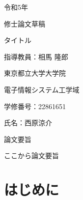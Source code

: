 \documentclass{ltjarticle}
\begin{document}
\begin{titlepage}
    \begin{center}
        {\Large 令和5年}
        \vspace{10truept}

        {\Large 修士論文草稿}
        \vspace*{180truept}

        {\Huge タイトル} 
        \vspace{160truept}

        {\Large 指導教員：相馬 隆郎}
        \vspace{30truept}

        {\Large 東京都立大学大学院}
        \vspace{10truept}

        {\Large 電子情報システム工学域}
        \vspace{30truept}

        {\Large 学修番号：22861651}
        \vspace{10truept}
        
        {\Large 氏名：西原涼介}
    \end{center}
\end{titlepage}
\noindent
{\LARGE 論文要旨}
\vspace{20truept}

ここから論文要旨

\newpage
\tableofcontents
\clearpage

\part{はじめに}
\vspace{10truept}
\end{document}
